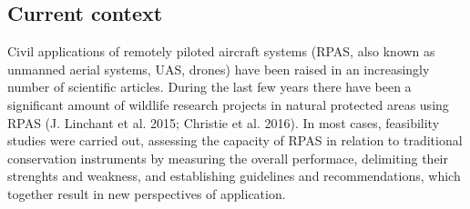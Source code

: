 \documentclass[]{interact}
\theoremstyle{plain}%
\theoremstyle{definition}
\theoremstyle{remark}
\begin{document}
\subsection{Current context}\label{current-context}

Civil applications of remotely piloted aircraft systems (RPAS, also
known as unmanned aerial systems, UAS, drones) have been raised in an
increasingly number of scientific articles. During the last few years
there have been a significant amount of wildlife research projects in
natural protected areas using RPAS (J. Linchant et al. 2015; Christie et
al. 2016). In most cases, feasibility studies were carried out,
assessing the capacity of RPAS in relation to traditional conservation
instruments by measuring the overall performace, delimiting their
strenghts and weakness, and establishing guidelines and recommendations,
which together result in new perspectives of application.
\end{document}
